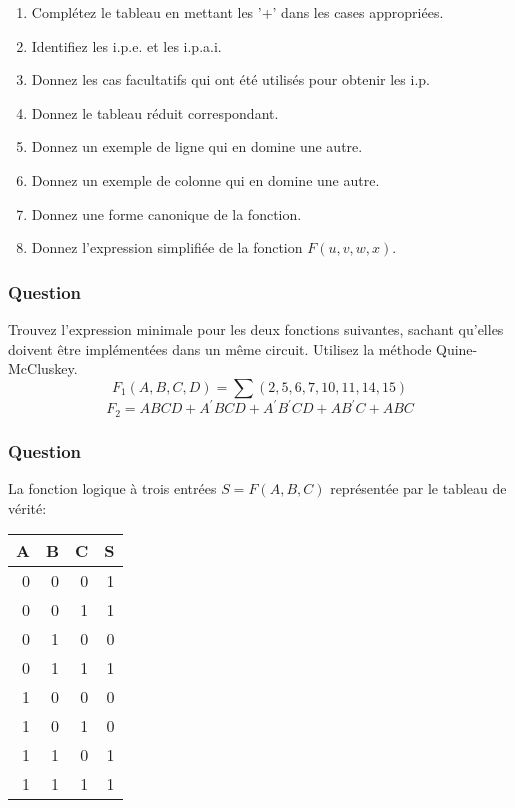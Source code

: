 \documentclass[11pt]{article}
\begin{document}
\begin{enumerate}
\item Complétez le tableau en mettant les '+' dans les cases
appropriées.

\item Identifiez les i.p.e. et les i.p.a.i.

\item Donnez les cas facultatifs qui ont été utilisés pour obtenir les
i.p.

\item Donnez le tableau réduit correspondant.

\item Donnez un exemple de ligne qui en domine une autre.

\item Donnez un exemple de colonne qui en domine une autre.

\item Donnez une forme canonique de la fonction.

\item Donnez l'expression simplifiée de la fonction \(F(u,v,w,x)\).
\end{enumerate}

\subsubsection*{Question}
\label{sec:org0f57859}
Trouvez l'expression minimale pour les deux fonctions suivantes,
   sachant qu'elles doivent être implémentées dans un même
   circuit. Utilisez la méthode Quine-McCluskey.
   $$
     F_1(A, B, C, D)
     =\sum(2,5,6,7,10,11,14,15)
     $$
   $$
     F_2 = A B C D + A^\prime B C D +
     A^\prime B^\prime C D + A B^\prime C + ABC
     $$

\subsubsection*{Question}
\label{sec:orgffa2278}
La fonction logique à trois entrées \(S = F(A,B,C)\) représentée par le
  tableau de vérité:

\begin{center}
\begin{tabular}{rrrr}
A & B & C & S\\[0pt]
\hline
0 & 0 & 0 & 1\\[0pt]
0 & 0 & 1 & 1\\[0pt]
0 & 1 & 0 & 0\\[0pt]
0 & 1 & 1 & 1\\[0pt]
1 & 0 & 0 & 0\\[0pt]
1 & 0 & 1 & 0\\[0pt]
1 & 1 & 0 & 1\\[0pt]
1 & 1 & 1 & 1\\[0pt]
\end{tabular}
\end{center}
\end{document}
